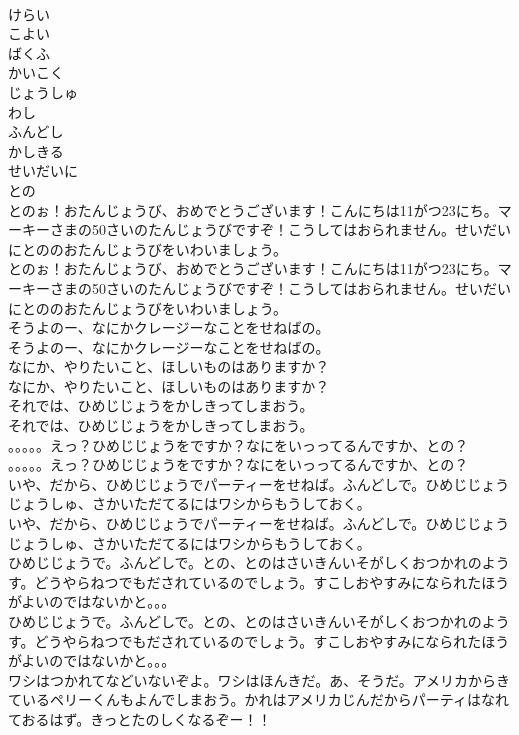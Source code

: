 \documentclass[8pt]{extreport}
\begin{document}
\begin{CJK}{UTF8}{min}
\\	けらい
\\	こよい
\\	ばくふ
\\	かいこく
\\	じょうしゅ
\\	わし
\\	ふんどし
\\	かしきる
\\	せいだいに
\\	との
\\	とのぉ！おたんじょうび、おめでとうございます！こんにちは11がつ23にち。マーキーさまの50さいのたんじょうびですぞ！こうしてはおられません。せいだいにとののおたんじょうびをいわいましょう。
\\	とのぉ！おたんじょうび、おめでとうございます！こんにちは11がつ23にち。マーキーさまの50さいのたんじょうびですぞ！こうしてはおられません。せいだいにとののおたんじょうびをいわいましょう。
\\	そうよのー、なにかクレージーなことをせねばの。
\\	そうよのー、なにかクレージーなことをせねばの。
\\	なにか、やりたいこと、ほしいものはありますか？
\\	なにか、やりたいこと、ほしいものはありますか？
\\	それでは、ひめじじょうをかしきってしまおう。
\\	それでは、ひめじじょうをかしきってしまおう。
\\	。。。。。えっ？ひめじじょうをですか？なにをいっってるんですか、との？
\\	。。。。。えっ？ひめじじょうをですか？なにをいっってるんですか、との？
\\	いや、だから、ひめじじょうでパーティーをせねば。ふんどしで。ひめじじょうじょうしゅ、さかいただてるにはワシからもうしておく。
\\	いや、だから、ひめじじょうでパーティーをせねば。ふんどしで。ひめじじょうじょうしゅ、さかいただてるにはワシからもうしておく。
\\	ひめじじょうで。ふんどしで。との、とのはさいきんいそがしくおつかれのようす。どうやらねつでもだされているのでしょう。すこしおやすみになられたほうがよいのではないかと。。。
\\	ひめじじょうで。ふんどしで。との、とのはさいきんいそがしくおつかれのようす。どうやらねつでもだされているのでしょう。すこしおやすみになられたほうがよいのではないかと。。。
\\	ワシはつかれてなどいないぞよ。ワシはほんきだ。あ、そうだ。アメリカからきているペリーくんもよんでしまおう。かれはアメリカじんだからパーティはなれておるはず。きっとたのしくなるぞー！！

\end{CJK}
\end{document}
